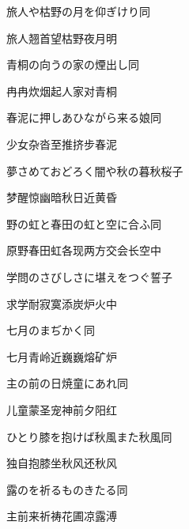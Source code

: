 \begin{haiku}
    {\FH 旅人や枯野の月を仰ぎけり}\hfill{\FH 同}

    {\FK 旅人翘首望枯野夜月明}
\end{haiku}

\begin{haiku}
    {\FH 青桐の向うの家の煙出し}\hfill{\FH 同}

    {\FK 冉冉炊烟起人家对青桐}
\end{haiku}

\begin{haiku}
    {\FH 春泥に押しあひながら来る娘}\hfill{\FH 同}

    {\FK 少女杂沓至推挤步春泥}
\end{haiku}

\begin{haiku}
    {\FH 夢さめておどろく闇や秋の暮}\hfill{\FH 秋桜子}

    {\FK 梦醒惊幽暗秋日近黄昏}
\end{haiku}

\begin{haiku}
    {\FH 野の虹と春田の虹と空に合ふ}\hfill{\FH 同}

    {\FK 原野春田虹各现两方交会长空中}
\end{haiku}

\begin{haiku}
    {\FH 学問のさびしさに堪えをつぐ}\hfill{\FH 誓子}

    {\FK 求学耐寂寞添炭炉火中}
\end{haiku}

\begin{haiku}
    {\FH 七月のまぢかく}\hfill{\FH 同}

    {\FK 七月青岭近巍巍熔矿炉}
\end{haiku}

\begin{haiku}
    {\FH 主の前の日焼童にあれ}\hfill{\FH 同}

    {\FK 儿童蒙圣宠神前夕阳红}
\end{haiku}

\begin{haiku}
    {\FH ひとり膝を抱けば秋風また秋風}\hfill{\FH 同}

    {\FK 独自抱膝坐秋风还秋风}
\end{haiku}

\begin{haiku}
    {\FH 露のを祈るものきたる}\hfill{\FH 同}

    {\FK 主前来祈祷花圃凉露溥}
\end{haiku}

